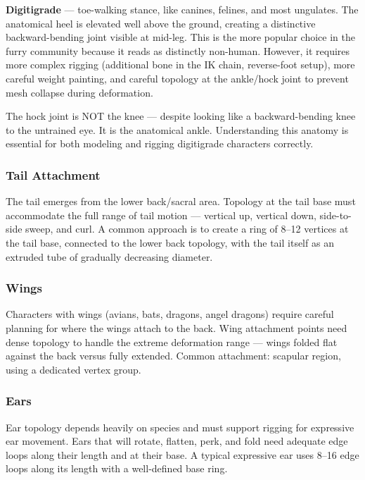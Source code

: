 \textbf{Digitigrade} --- toe-walking stance, like canines, felines, and most ungulates. The anatomical heel is elevated well above the ground, creating a distinctive backward-bending joint visible at mid-leg. This is the more popular choice in the furry community because it reads as distinctly non-human. However, it requires more complex rigging (additional bone in the IK chain, reverse-foot setup), more careful weight painting, and careful topology at the ankle/hock joint to prevent mesh collapse during deformation.

\begin{warningbox}
The hock joint is NOT the knee --- despite looking like a backward-bending knee to the untrained eye. It is the anatomical ankle. Understanding this anatomy is essential for both modeling and rigging digitigrade characters correctly.
\end{warningbox}

\subsubsection{Tail Attachment}

The tail emerges from the lower back/sacral area. Topology at the tail base must accommodate the full range of tail motion --- vertical up, vertical down, side-to-side sweep, and curl. A common approach is to create a ring of 8--12 vertices at the tail base, connected to the lower back topology, with the tail itself as an extruded tube of gradually decreasing diameter.

\subsubsection{Wings}

Characters with wings (avians, bats, dragons, angel dragons) require careful planning for where the wings attach to the back. Wing attachment points need dense topology to handle the extreme deformation range --- wings folded flat against the back versus fully extended. Common attachment: scapular region, using a dedicated vertex group.

\subsubsection{Ears}

Ear topology depends heavily on species and must support rigging for expressive ear movement. Ears that will rotate, flatten, perk, and fold need adequate edge loops along their length and at their base. A typical expressive ear uses 8--16 edge loops along its length with a well-defined base ring.


